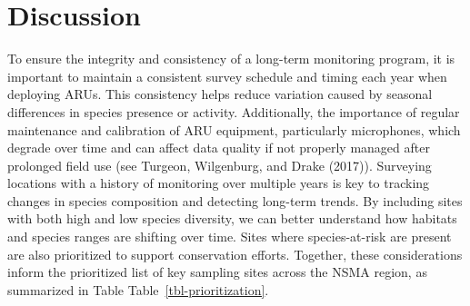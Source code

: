 \documentclass[
  letterpaper,
  DIV=11,
  numbers=noendperiod,
  oneside]{scrartcl}
\begin{document}
\section{Discussion}\label{discussion}

To ensure the integrity and consistency of a long-term monitoring
program, it is important to maintain a consistent survey schedule and
timing each year when deploying ARUs. This consistency helps reduce
variation caused by seasonal differences in species presence or
activity. Additionally, the importance of regular maintenance and
calibration of ARU equipment, particularly microphones, which degrade
over time and can affect data quality if not properly managed after
prolonged field use (see Turgeon, Wilgenburg, and Drake (2017)).
Surveying locations with a history of monitoring over multiple years is
key to tracking changes in species composition and detecting long-term
trends. By including sites with both high and low species diversity, we
can better understand how habitats and species ranges are shifting over
time. Sites where species-at-risk are present are also prioritized to
support conservation efforts. Together, these considerations inform the
prioritized list of key sampling sites across the NSMA region, as
summarized in Table Table~\ref{tbl-prioritization}.
\end{document}
